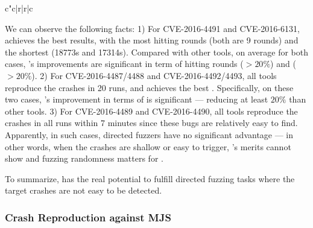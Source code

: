\begin{table}[t]
\begin{tabular}{c"c|r|r|c}
\end{tabular}  
\end{table}

We can observe the following facts: 
1) For CVE-2016-4491 and CVE-2016-6131, \dFOT achieves the best results, with the most hitting rounds (both are 9 rounds) and the shortest {\utte} (18773s and 17314s). Compared with other tools, on average for both cases, \dFOT's improvements are significant in term of hitting rounds ($>20\%$) and {\utte} ($>20\%$).
2) For CVE-2016-4487/4488 and CVE-2016-4492/4493, all tools reproduce the crashes in 20 runs, and \dFOT achieves the best {\utte}. Specifically, on these two cases, \dFOT's improvement in terms of {\utte} is significant --- reducing at least $20\%$ than other tools.
3) For CVE-2016-4489 and CVE-2016-4490, all tools reproduce the crashes in all runs within 7 minutes since these bugs are relatively easy to find. 
Apparently, in such cases, directed fuzzers have no significant advantage --- in other words, when the crashes are shallow or easy to trigger, \dFOT's merits cannot show and fuzzing randomness matters for \utte.

To summarize, {\dFOT} has the real potential to fulfill directed fuzzing tasks where the target crashes are not easy to be detected.

\subsubsection{Crash Reproduction against MJS}

